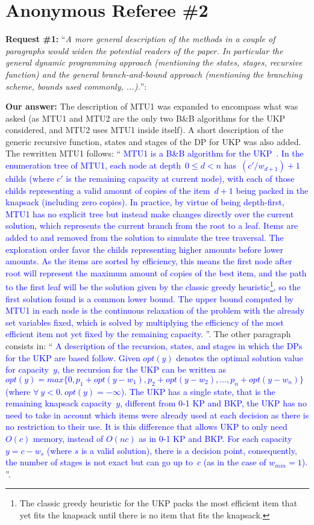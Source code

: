 \documentclass{elsarticle}
\begin{document}
\section{Anonymous Referee \#2}

\textbf{Request \#1:} ``\textit{A more general description of the methods in a couple of paragraphs would widen the potential readers of the paper. In particular the general dynamic programming approach (mentioning the states, stages, recursive function) and the general branch-and-bound approach (mentioning the branching scheme, bounds used commonly, ...).}'': 

\textbf{Our answer:} The description of MTU1 was expanded to encompass what was asked (as MTU1 and MTU2 are the only two B\&B algorithms for the UKP considered, and MTU2 uses MTU1 inside itself). A short description of the generic recursive function, states and stages of the DP for UKP was also added. The rewritten MTU1 follows: ``\textcolor{blue}{
MTU1 is a B\&B algorithm for the UKP~\citep{mtu1}. %
In the enumeration tree of MTU1, each node at depth~\(0 \leq d < n\) has~\((c'/w_{d+1}) + 1\) childs (where \(c'\) is the remaining capacity at current node), with each of those childs representing a valid amount of copies of the item~\(d+1\) being packed in the knapsack (including zero copies).
In practice, by virtue of being depth-first, MTU1 has no explicit tree but instead make changes directly over the current solution, which represents the current branch from the root to a leaf.
Items are added to and removed from the solution to simulate the tree traversal.
The exploration order favor the childs representing higher amounts before lower amounts.
As the items are sorted by efficiency, this means the first node after root will represent the maximum amount of copies of the best item, and the path to the first leaf will be the solution given by the classic greedy heuristic\footnote{The classic greedy heuristic for the UKP packs the most efficient item that yet fits the knapsack until there is no item that fits the knapsack.}, so the first solution found is a common lower bound.
The upper bound computed by MTU1 in each node is the continuous relaxation of the problem with the already set variables fixed, which is solved by multiplying the efficiency of the most efficient item not yet fixed by the remaining capacity.
}''.
The other paragraph consists in: ``\textcolor{blue}{
A description of the recursion, states, and stages in which the DPs for the UKP are based follow.
Given \(opt(y)\) denotes the optimal solution value for capacity~\(y\), the recursion for the UKP can be written as \(opt(y) = max \{0, p_1 + opt(y - w_1), p_2 + opt(y - w_2), \dots, p_n + opt(y - w_n)\}\) (where \(\forall~y < 0.~opt(y) = -\infty\)).
The UKP has a single state, that is the remaining knapsack capacity~\(y\), different from 0-1 KP and BKP, the UKP has no need to take in account which items were already used at each decision as there is no restriction to their use.
It is this difference that allows UKP to only need \(O(c)\) memory, instead of \(O(nc)\) as in 0-1 KP and BKP.
For each capacity~\(y = c - w_s\) (where \(s\) is a valid solution), there is a decision point, consequently, the number of stages is not exact but can go up to~\(c\) (as in the case of \(w_{min} = 1\)).
}''.
\end{document}
